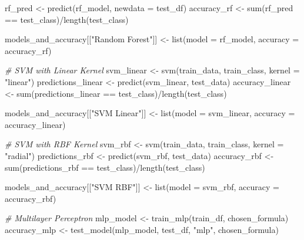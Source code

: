 \documentclass[
]{article}
\newenvironment{Shaded}{\begin{snugshade}}{\end{snugshade}}
\newcommand{\AttributeTok}[1]{\textcolor[rgb]{0.77,0.63,0.00}{#1}}
\newcommand{\CommentTok}[1]{\textcolor[rgb]{0.56,0.35,0.01}{\textit{#1}}}
\newcommand{\FunctionTok}[1]{\textcolor[rgb]{0.00,0.00,0.00}{#1}}
\newcommand{\NormalTok}[1]{#1}
\newcommand{\OtherTok}[1]{\textcolor[rgb]{0.56,0.35,0.01}{#1}}
\newcommand{\SpecialCharTok}[1]{\textcolor[rgb]{0.00,0.00,0.00}{#1}}
\newcommand{\StringTok}[1]{\textcolor[rgb]{0.31,0.60,0.02}{#1}}
\begin{document}
\begin{Shaded}
\begin{Highlighting}[]
\NormalTok{    rf\_pred }\OtherTok{\textless{}{-}} \FunctionTok{predict}\NormalTok{(rf\_model, }\AttributeTok{newdata =}\NormalTok{ test\_df)}
\NormalTok{    accuracy\_rf }\OtherTok{\textless{}{-}} \FunctionTok{sum}\NormalTok{(rf\_pred }\SpecialCharTok{==}\NormalTok{ test\_class)}\SpecialCharTok{/}\FunctionTok{length}\NormalTok{(test\_class)}

\NormalTok{    models\_and\_accuracy[[}\StringTok{"Random Forest"}\NormalTok{]] }\OtherTok{\textless{}{-}} \FunctionTok{list}\NormalTok{(}\AttributeTok{model =}\NormalTok{ rf\_model, }\AttributeTok{accuracy =}\NormalTok{ accuracy\_rf)}

    \CommentTok{\# SVM with Linear Kernel}
\NormalTok{    svm\_linear }\OtherTok{\textless{}{-}} \FunctionTok{svm}\NormalTok{(train\_data, train\_class, }\AttributeTok{kernel =} \StringTok{"linear"}\NormalTok{)}
\NormalTok{    predictions\_linear }\OtherTok{\textless{}{-}} \FunctionTok{predict}\NormalTok{(svm\_linear, test\_data)}
\NormalTok{    accuracy\_linear }\OtherTok{\textless{}{-}} \FunctionTok{sum}\NormalTok{(predictions\_linear }\SpecialCharTok{==}\NormalTok{ test\_class)}\SpecialCharTok{/}\FunctionTok{length}\NormalTok{(test\_class)}

\NormalTok{    models\_and\_accuracy[[}\StringTok{"SVM Linear"}\NormalTok{]] }\OtherTok{\textless{}{-}} \FunctionTok{list}\NormalTok{(}\AttributeTok{model =}\NormalTok{ svm\_linear, }\AttributeTok{accuracy =}\NormalTok{ accuracy\_linear)}

    \CommentTok{\# SVM with RBF Kernel}
\NormalTok{    svm\_rbf }\OtherTok{\textless{}{-}} \FunctionTok{svm}\NormalTok{(train\_data, train\_class, }\AttributeTok{kernel =} \StringTok{"radial"}\NormalTok{)}
\NormalTok{    predictions\_rbf }\OtherTok{\textless{}{-}} \FunctionTok{predict}\NormalTok{(svm\_rbf, test\_data)}
\NormalTok{    accuracy\_rbf }\OtherTok{\textless{}{-}} \FunctionTok{sum}\NormalTok{(predictions\_rbf }\SpecialCharTok{==}\NormalTok{ test\_class)}\SpecialCharTok{/}\FunctionTok{length}\NormalTok{(test\_class)}

\NormalTok{    models\_and\_accuracy[[}\StringTok{"SVM RBF"}\NormalTok{]] }\OtherTok{\textless{}{-}} \FunctionTok{list}\NormalTok{(}\AttributeTok{model =}\NormalTok{ svm\_rbf, }\AttributeTok{accuracy =}\NormalTok{ accuracy\_rbf)}

    \CommentTok{\# Multilayer Perceptron}
\NormalTok{    mlp\_model }\OtherTok{\textless{}{-}} \FunctionTok{train\_mlp}\NormalTok{(train\_df, chosen\_formula)}
\NormalTok{    accuracy\_mlp }\OtherTok{\textless{}{-}} \FunctionTok{test\_model}\NormalTok{(mlp\_model, test\_df, }\StringTok{"mlp"}\NormalTok{, chosen\_formula)}


\end{Highlighting}
\end{Shaded}
\end{document}
